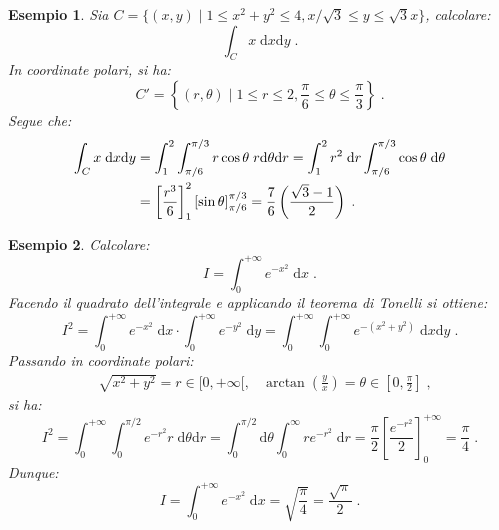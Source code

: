 \documentclass[a4paper,12pt]{report}
\theoremstyle{plain}
\newtheorem{exm}{Esempio}[section]
\theoremstyle{definition}
\theoremstyle{remark}
\newcommand{\diff}[1]{\mathrm{d}#1}
\numberwithin{equation}{section}
\begin{document}
\begin{exm} Sia $C=\{(x,y)\;|\;1\le x^2+y^2\le 4, x/\sqrt{3}\le y\le \sqrt{3}x\}$, calcolare:
\begin{equation}
\int_C x\;\diff{x}\diff{y}\;.
\end{equation}
In coordinate polari, si ha:
\begin{equation}
C'=\left\{(r,\theta)\;|\; 1\le r\le 2, \frac{\pi}{6}\le \theta\le \frac{\pi}{3}\right\}\;.
\end{equation}
Segue che:
\begin{align}
\int_C x\;\diff{x}\diff{y} &= \int_1^2\int_{\pi/6}^{\pi/3}r\cos\theta\; r\diff{\theta}\diff{r}=\int_1^2 r^2\;\diff{r}\int_{\pi/6}^{\pi/3}\cos\theta\;\diff{\theta} \notag \\
&=\left[\frac{r^3}{6}\right]^2_1[\sin\theta]^{\pi/3}_{\pi/6}=\frac{7}{6}\left(\frac{\sqrt{3}-1}{2}\right)\;.
\end{align}
\end{exm}
\begin{exm} Calcolare:
\begin{equation}
I=\int_0^{+\infty} e^{-x^2}\;\diff{x}\;.
\end{equation}
Facendo il quadrato dell'integrale e applicando il teorema di Tonelli si ottiene:
\begin{equation}
I^2=\int_0^{+\infty}e^{-x^2}\;\diff{x}\cdot\int_0^{+\infty}e^{-y^2}\;\diff{y}=\int_0^{+\infty}\int_0^{+\infty}e^{-(x^2+y^2)}\;\diff{x}\diff{y}\;.
\end{equation}
Passando in coordinate polari:
\begin{align}
&\sqrt{x^2+y^2}=r\in [0,+\infty[, &\arctan\left(\frac{y}{x}\right)=\theta\in \left[0, \frac{\pi}{2}\right]\;,
\end{align}
si ha:
\begin{equation}
I^2=\int_0^{+\infty}\int_0^{\pi/2}e^{-r^2}r\;\diff{\theta} \diff{r}=\int_0^{\pi/2}\diff{\theta}\int_0^{\infty}re^{-r^2}\;\diff{r}=\frac{\pi}{2}\left[\frac{e^{-r^2}}{2}\right]^{+\infty}_0=\frac{\pi}{4}\;.
\end{equation}
Dunque:
\begin{equation}
I=\int_0^{+\infty} e^{-x^2}\;\diff{x}=\sqrt{\frac{\pi}{4}}=\frac{\sqrt{\pi}}{2}\;.
\end{equation}
\end{exm}
\end{document}
